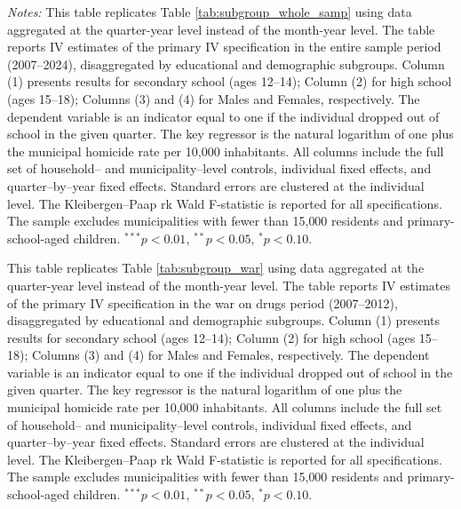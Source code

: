 \documentclass[12pt,letter,english,intoc,bibliography=totoc,index=totoc,BCOR10mm,captions=tableheading,nottitlepage,fleqn]{article}
\theoremstyle{break}
\begin{document}
\begin{table}[H]
\centering
\caption{Quarterly Subgroup Estimates: Whole Sample (2007--2024)}
\label{tab:subgroup_whole_quarterly}
\centering
\scriptsize 

\begin{minipage}{0.95\linewidth}
    \scriptsize \singlespacing
    \textit{Notes:} This table replicates Table \ref{tab:subgroup_whole_samp} using data aggregated at the quarter-year level instead of the month-year level. The table reports IV estimates of the primary IV specification in the entire sample period (2007--2024), disaggregated by educational and demographic subgroups. Column (1) presents results for secondary school (ages 12--14); Column (2) for high school (ages 15--18); Columns (3) and (4) for Males and Females, respectively. The dependent variable is an indicator equal to one if the individual dropped out of school in the given quarter. The key regressor is the natural logarithm of one plus the municipal homicide rate per 10{,}000 inhabitants. All columns include the full set of household-- and municipality--level controls, individual fixed effects, and quarter--by--year fixed effects. Standard errors are clustered at the individual level. The Kleibergen--Paap rk Wald F-statistic is reported for all specifications. The sample excludes municipalities with fewer than 15{,}000 residents and primary-school-aged children.
 $^{***}p<0.01$, $^{**}p<0.05$, $^{*}p<0.10$.
    \end{minipage}
\end{table}

\begin{table}[H]
\centering
\caption{Quarterly Subgroup Estimates: War on Drugs (2007--2012)}
\label{tab:subgroup_war_quarterly}
\centering
\scriptsize 

\begin{minipage}{0.95\linewidth}
    \scriptsize \singlespacing
    This table replicates Table \ref{tab:subgroup_war} using data aggregated at the quarter-year level instead of the month-year level. The table reports IV estimates of the primary IV specification in the war on drugs period (2007--2012), disaggregated by educational and demographic subgroups. Column (1) presents results for secondary school (ages 12--14); Column (2) for high school (ages 15--18); Columns (3) and (4) for Males and Females, respectively. The dependent variable is an indicator equal to one if the individual dropped out of school in the given quarter. The key regressor is the natural logarithm of one plus the municipal homicide rate per 10{,}000 inhabitants. All columns include the full set of household-- and municipality--level controls, individual fixed effects, and quarter--by--year fixed effects. Standard errors are clustered at the individual level. The Kleibergen--Paap rk Wald F-statistic is reported for all specifications. The sample excludes municipalities with fewer than 15{,}000 residents and primary-school-aged children.
 $^{***}p<0.01$, $^{**}p<0.05$, $^{*}p<0.10$.
    \end{minipage}
\end{table}
\end{document}
